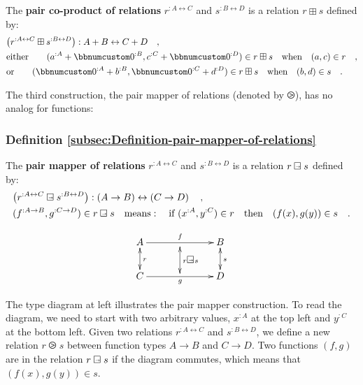 The \textbf{pair co-product of relations} $r^{:A\leftrightarrow C}$
and $s^{:B\leftrightarrow D}$ is a relation $r\boxplus s$ defined
by:
\begin{align*}
 & \big(r^{:A\leftrightarrow C}\boxplus s^{:B\leftrightarrow D}\big):A+B\leftrightarrow C+D\quad,\\
 & \text{either}\quad\quad(a^{:A}+\bbnum 0^{:B},c^{:C}+\bbnum 0^{:D})\in r\boxplus s\quad\text{when}\quad(a,c)\in r\quad,\\
 & \text{or}\quad\quad(\bbnum 0^{:A}+b^{:B},\bbnum 0^{:C}+d^{:D})\in r\boxplus s\quad\text{when}\quad(b,d)\in s\quad.
\end{align*}

The third construction, the pair mapper of relations
(denoted by $\ogreaterthan$), has no analog for functions:

\subsubsection{Definition \label{subsec:Definition-pair-mapper-of-relations}\ref{subsec:Definition-pair-mapper-of-relations}}

The \textbf{pair mapper of relations} $r^{:A\leftrightarrow C}$ and
$s^{:B\leftrightarrow D}$ is a relation $r\varogreaterthan s$ defined
by:
\begin{align*}
 & \big(r^{:A\leftrightarrow C}\varogreaterthan s^{:B\leftrightarrow D}\big):\left(A\rightarrow B\right)\leftrightarrow\left(C\rightarrow D\right)\quad,\\
 & (f^{:A\rightarrow B},g^{:C\rightarrow D})\in r\varogreaterthan s\quad\text{means}:\quad\text{if }(x^{:A},y^{:C})\in r\quad\text{then}\quad(f(x),g(y))\in s\quad.
\end{align*}

\begin{wrapfigure}{l}{0.24\columnwidth}%
\vspace{-2.8\baselineskip}
\[
\xymatrix{\xyScaleY{1.8pc}\xyScaleX{2.6pc}A\ar@{<->}[d]\sp(0.5){r}\ar[rr]\sp(0.5){f} & \ar@{<->}[d(0.9)]\sp(0.55){r\varogreaterthan s} & B\ar@{<->}[d]\sp(0.5){s}\\
C\ar[rr]\sb(0.5){g} &  & D
}
\]

\vspace{-2.5\baselineskip}
\end{wrapfigure}%

\noindent The type diagram at left illustrates the pair mapper construction.
To read the diagram, we need to start with two arbitrary values, $x^{:A}$
at the top left and $y^{:C}$ at the bottom left. Given two relations
$r^{:A\leftrightarrow C}$ and $s^{:B\leftrightarrow D}$, we define
a new relation $r\ogreaterthan s$ between function types $A\rightarrow B$
and $C\rightarrow D$. Two functions $\left(f,g\right)$ are in the
relation $r\varogreaterthan s$ if the diagram commutes, which means
that $(f(x),g(y))\in s$.


